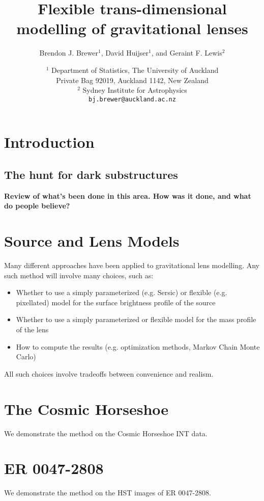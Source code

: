\documentclass[a4paper, 11pt]{article}
\title{}
\title{Flexible trans-dimensional modelling of gravitational lenses}
\author{Brendon J. Brewer$^1$, David Huijser$^1$, and
Geraint F. Lewis$^2$}
\date{\small $^1$ Department of Statistics, The University of Auckland\\
Private Bag 92019, Auckland 1142, New Zealand\\
$^2$ Sydney Institute for Astrophysics\\
\vspace{1cm}
{\tt bj.brewer@auckland.ac.nz}}
\begin{document}
\maketitle


\section{Introduction}


\subsection{The hunt for dark substructures}
{\bf Review of what's been done in this area. How was it done, and what do
people believe?}

\section{Source and Lens Models}
Many different approaches have been applied to gravitational lens modelling.
Any such method will involve many choices, such as:
\begin{itemize}
\item Whether to use a simply parameterized (e.g. Sersic)
or flexible (e.g. pixellated)
model for the surface brightness profile of the source
\item Whether to use a simply parameterized or flexible
model for the mass profile of the lens
\item How to compute the results (e.g. optimization methods, Markov Chain
Monte Carlo)
\end{itemize}

All such choices involve tradeoffs between convenience and realism.


\section{The Cosmic Horseshoe}
We demonstrate the method on the Cosmic Horseshoe INT data.


\section{ER 0047-2808}
We demonstrate the method on the HST images of ER 0047-2808.
\end{document}
